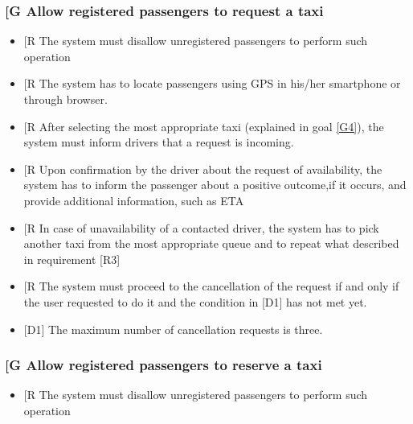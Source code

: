 \documentclass[a4paper,12pt]{article}%
\newcounter{goals_counter}
\newcounter{func_req_counter}
\begin{document}
\subsubsection{\label{goal\arabic{goals_counter}}{[}G\arabic{goals_counter}{]} Allow registered passengers to request a taxi}
\begin{itemize}
\item {[}R\arabic{func_req_counter}{]} The system must disallow unregistered passengers to perform such operation
\item {[}R\arabic{func_req_counter}{]} The system has to locate passengers using GPS in his/her smartphone or through browser.
\item {[}R\arabic{func_req_counter}{]} After selecting the most appropriate taxi (explained in goal \hyperref[goal4]{[G4]}), the system must inform drivers that a request is incoming.
\item {[}R\arabic{func_req_counter}{]} Upon confirmation by the driver about the request of availability, the system has to inform the passenger about a positive outcome,if it occurs, and provide additional information, such as ETA
\item {[}R\arabic{func_req_counter}{]} In case of unavailability of a contacted driver, the system has to pick another taxi from the most appropriate queue and to repeat what described in requirement [R3]
\item {[}R\arabic{func_req_counter}{]} The system must proceed to the cancellation of the request if and only if the user requested to do it and the condition in [D1] has not met yet.
\item {[}D1{]} The maximum number of cancellation requests is three.
\end{itemize}
\setcounter{func_req_counter}{1}
\subsubsection{\label{goal\arabic{goals_counter}}{[}G\arabic{goals_counter}{]} Allow registered passengers to reserve a taxi}
\begin{itemize}
\item {[}R\arabic{func_req_counter}{]} The system must disallow unregistered passengers to perform such operation
\end{itemize}
\end{document}
